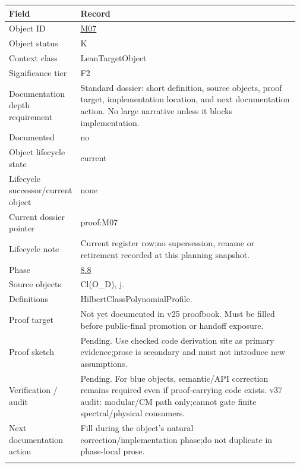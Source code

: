 \begin{longtable}{L{0.16\linewidth} L{0.81\linewidth}}
\hline
\textbf{Field} & \textbf{Record}\\
\hline
Object ID & \hyperlink{object-row-M07}{M07}\\
\hline\addlinespace[0.20em]
Object status & K\\
\hline\addlinespace[0.20em]
Context class & LeanTargetObject\\
\hline\addlinespace[0.20em]
Significance tier & F2\\
\hline\addlinespace[0.20em]
Documentation depth requirement & Standard dossier: short definition, source objects, proof target, implementation location, and next documentation action. No large narrative unless it blocks implementation.\\
\hline\addlinespace[0.20em]
Documented & no\\
\hline\addlinespace[0.20em]
Object lifecycle state & current\\
\hline\addlinespace[0.20em]
Lifecycle successor/\allowbreak{}current object & none\\
\hline\addlinespace[0.20em]
Current dossier pointer & proof:M07\\
\hline\addlinespace[0.20em]
Lifecycle note & Current register row;\newline no supersession, rename or retirement recorded at this planning snapshot.\\
\hline\addlinespace[0.20em]
Phase & \hyperlink{phase-row-8-8}{8.8}\\
\hline\addlinespace[0.20em]
Source objects & Cl(O\_D), j.\\
\hline\addlinespace[0.20em]
Definitions & HilbertClassPolynomialProfile.\\
\hline\addlinespace[0.20em]
Proof target & Not yet documented in v25 proofbook. Must be filled before public-final promotion or handoff exposure.\\
\hline\addlinespace[0.20em]
Proof sketch & Pending. Use checked code derivation site as primary evidence;\newline prose is secondary and must not introduce new assumptions.\\
\hline\addlinespace[0.20em]
Verification /\allowbreak{} audit & Pending. For blue objects, semantic/\allowbreak{}API correction remains required even if proof-carrying code exists. v37 audit: modular/\allowbreak{}CM path only;\newline cannot gate finite spectral/\allowbreak{}physical consumers.\\
\hline\addlinespace[0.20em]
Next documentation action & Fill during the object's natural correction/\allowbreak{}implementation phase;\newline do not duplicate in phase-local prose.\\
\hline\addlinespace[0.20em]
\end{longtable}
